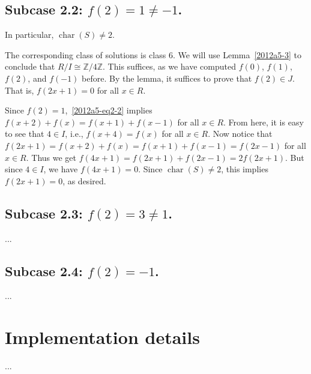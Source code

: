 \documentclass{article}
\newcommand{\Z}{\mathbb{Z}}
\DeclareMathOperator{\rchar}{char}
\begin{document}
\subsection*{Subcase 2.2: $f(2) = 1 \neq -1$.}

In particular, $\rchar(S) \neq 2$.

The corresponding class of solutions is class 6.
We will use Lemma~\ref{2012a5-3} to conclude that $R/I \cong \Z/4\Z$.
This suffices, as we have computed $f(0)$, $f(1)$, $f(2)$, and $f(-1)$ before.
By the lemma, it suffices to prove that $f(2) \in J$.
That is, $f(2x + 1) = 0$ for all $x \in R$.

Since $f(2) = 1$,~\eqref{2012a5-eq2-2} implies $f(x + 2) + f(x) = f(x + 1) + f(x - 1)$ for all $x \in R$.
From here, it is easy to see that $4 \in I$, i.e., $f(x + 4) = f(x)$ for all $x \in R$.
Now notice that $f(2x + 1) = f(x + 2) + f(x) = f(x + 1) + f(x - 1) = f(2x - 1)$ for all $x \in R$.
Thus we get $f(4x + 1) = f(2x + 1) + f(2x - 1) = 2 f(2x + 1)$.
But since $4 \in I$, we have $f(4x + 1) = 0$.
Since $\rchar(S) \neq 2$, this implies $f(2x + 1) = 0$, as desired.


\subsection*{Subcase 2.3: $f(2) = 3 \neq 1$.}

...


\subsection*{Subcase 2.4: $f(2) = -1$.}

...



\section*{Implementation details}

...
\end{document}
